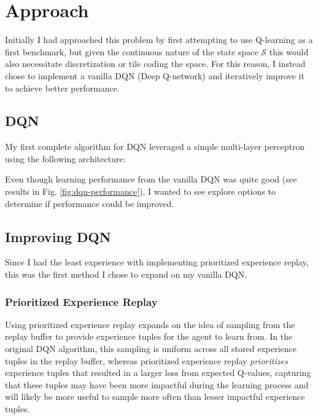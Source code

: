 \documentclass[11pt]{article}
\begin{document}
\section{Approach}

Initially I had approached this problem by first attempting to use Q-learning as
a first benchmark, but given the continuous nature of the state space
$\mathcal{S}$ this would also necessitate discretization or tile coding the
space. For this reason, I instead chose to implement a vanilla DQN (Deep
Q-network) and iteratively improve it to achieve better performance.

\subsection{DQN}

My first complete algorithm for DQN leveraged a simple multi-layer perceptron
using the following architecture:

\FloatBarrier

\begin{figure}[!ht]
    \centering
    \caption{}
    \label{fig:dqn-architecture}
\end{figure}

\FloatBarrier

Even though learning performance from the vanilla DQN was quite good (see results in
Fig. \ref{fig:dqn-performance}), I wanted to see explore options to determine if
performance could be improved.

\subsection{Improving DQN}

Since I had the least experience with implementing prioritized experience
replay, this was the first method I chose to expand on my vanilla DQN.

\subsubsection{Prioritized Experience Replay}

Using prioritized experience replay expands on the idea of sampling from the
replay buffer to provide experience tuples for the agent to learn from. In the
original DQN algorithm, this sampling is uniform across all stored experience
tuples in the replay buffer, whereas prioritized experience replay
\textit{prioritizes} experience tuples that resulted in a larger loss from
expected Q-values, capturing that these tuples may have been more impactful
during the learning process and will likely be more useful to sample more often
than lesser impactful experience tuples.
\end{document}
